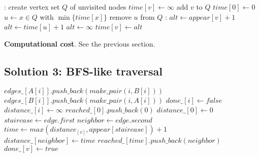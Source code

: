 \documentclass{article}
\begin{document}
\begin{algorithmic}[1]
  :
  \State create vertex set $Q$ of unvisited nodes
        
      \State $time[v] \gets \infty$  
      \State add $v$ to $Q$          
  \EndFor
  \State $time[0] \gets 0$ 
      \State $u \gets x \in Q$ with $\min\{time[x]\}$
      \State remove $u$ from $Q$
      :
              \State $alt \gets appear[v] + 1$ 
              \State $alt \gets time[u] + 1$       
          \Else
              \State $alt \gets \infty$            
          \EndIf
              \State $time[v] \gets alt$           
          \EndIf
      \EndFor
  \EndWhile
  \State {}
  \EndFunction
\end{algorithmic}

\begin{framed}
  \noindent
  \textbf{Computational cost}. See the previous section.
\end{framed}

\subsection{Solution 3: BFS-like traversal}

\begin{algorithmic}[1]
          \State $edges\_[A[i]].push\_back(make\_pair(i, B[i]))$
          \State $edges\_[B[i]].push\_back(make\_pair(i, A[i]))$
      \EndFor
          \State $done\_[i] \gets false$
          \State $distance\_[i] \gets \infty$
      \EndFor
      \State $reached\_[0].push\_back(0)$
    \State $distance\_[0] \gets 0$
            \State $staircase \gets edge.first$
            \State $neighbor \gets edge.second$
            \State $time \gets max(distance_[v], appear[staircase])+1$
              \State $distance\_[neighbor] \gets time$
              \State $reached\_[time].push\_back(neighbor)$
            \EndIf
          \EndFor
        \State $done\_[v] \gets true$
          \EndIf
      \EndFor
    \EndFor
    \State {}
  \EndFunction
\end{algorithmic}
\end{document}
